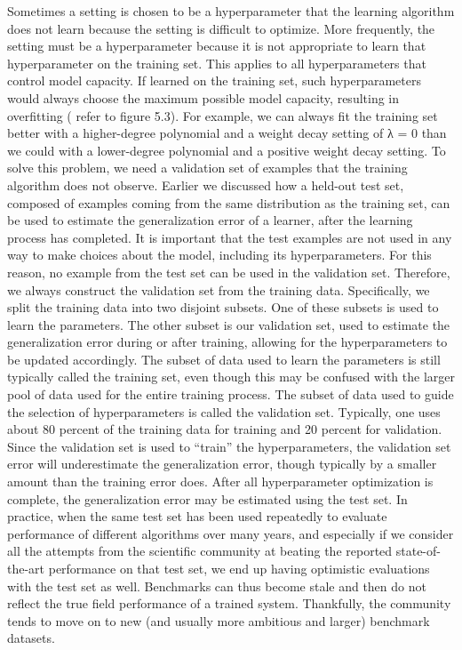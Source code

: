 \documentclass[11pt]{article}
\begin{document}
Sometimes a setting is chosen to be a hyperparameter that the learning algorithm does not learn because the setting is diﬃcult to optimize.
More frequently, the setting must be a hyperparameter because it is not appropriate to learn that hyperparameter on the training set.
This applies to all hyperparameters that
control model capacity.
If learned on the training set, such hyperparameters would
always choose the maximum possible model capacity, resulting in overﬁtting (
refer
to ﬁgure 5.3).
For example, we can always ﬁt the training set better with a
higher-degree polynomial and a weight decay setting of
λ
= 0 than we could with
a lower-degree polynomial and a positive weight decay setting.
To solve this problem, we need a
validation set
of examples that the training
algorithm does not observe.
Earlier we discussed how a held-out test set, composed of examples coming from
the same distribution as the training set, can be used to estimate the generalization
error of a learner, after the learning process has completed.
It is important that the
test examples are not used in any way to make choices about the model, including
its hyperparameters.
For this reason, no example from the test set can be used in the validation set.
Therefore, we always construct the validation set from the training data.
Speciﬁcally, we split the training data into two disjoint subsets.
One of these subsets is used to learn the parameters.
The other subset is our validation set, used to estimate the generalization error during or after training, allowing for the hyperparameters to be updated accordingly.
The subset of data used to learn the parameters is still typically called the training set, even though this may be confused with the larger pool of data used for the entire training process.
The subset of data used to guide the selection of hyperparameters is called the validation set.
Typically, one uses about 80 percent of the training data for training and 20 percent for validation.
Since the validation set is used to “train” the hyperparameters, the validation set error will underestimate the generalization error, though typically by a smaller amount than the training error does.
After all hyperparameter optimization is complete, the generalization error may be estimated using the test set.
In practice, when the same test set has been used repeatedly to evaluate performance of diﬀerent algorithms over many years, and especially if we consider all the attempts from the scientiﬁc community at beating the reported state-of-the-art performance on that test set, we end up having optimistic evaluations with the test set as well.
Benchmarks can thus become stale and then do not reﬂect the true ﬁeld performance of a trained system.
Thankfully, the community tends to move on to new (and usually more ambitious and larger) benchmark datasets.
\end{document}
